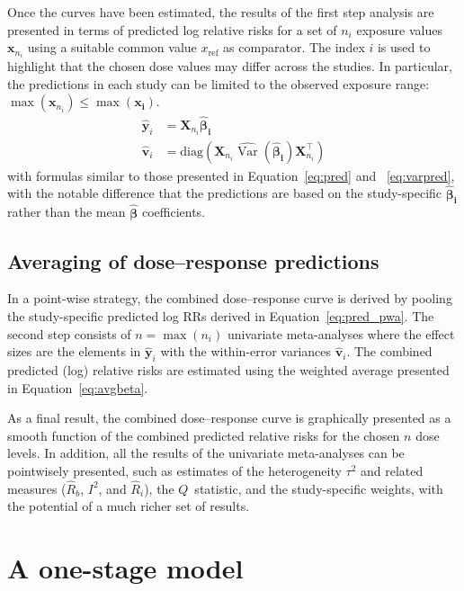 \documentclass[11pt,a4paper,twoside,openany]{book}\usepackage{knitr}
\DeclareMathOperator{\Var}{Var}
\begin{document}
{{Once the curves have been estimated, the results of the first step analysis are presented in terms of predicted log relative risks for a set of $n_i$ exposure values $\mathbf{x}_{n_i}$ using a suitable common value $x_\mathrm{ref}$ as comparator. The index $i$ is used to highlight that the chosen dose values may differ across the studies. In particular, the predictions in each study can be limited to the observed exposure range: $\max \left( \mathbf{x}_{n_i} \right) \le \max \left( \mathbf{x_i} \right)$.
\begin{align}
\hat {\boldsymbol y}_i &= \mathbf{X}_{n_i} \boldsymbol{\hat \beta_i}
\label{eq:pred_pwa} \\
\hat{\boldsymbol{v}}_i &= \mathrm{diag}\left( \mathbf{X}_{n_i} \widehat{\Var} \left( \boldsymbol{\hat \beta_i} \right) \mathbf{X}_{n_i}^\top \right)
\label{eq:predv_pwa}
\end{align}
\noindent with formulas similar to those presented in Equation~\ref{eq:pred} and ~\ref{eq:varpred}, with the notable difference that the predictions are based on the study-specific $\boldsymbol{\hat \beta_i}$ rather than the mean $\boldsymbol{\hat \beta}$ coefficients.

\subsection{Averaging of dose--response predictions}

In a point-wise strategy, the combined dose--response curve is derived by pooling the study-specific predicted log RRs derived in Equation~\ref{eq:pred_pwa}. The second step consists of $n = \max(n_i)$ univariate meta-analyses where the effect sizes are the elements in $\hat {\boldsymbol y}_i$ with the within-error variances $\hat{\boldsymbol{v}}_i$.
The combined predicted (log) relative risks are estimated using the weighted average presented in Equation~\ref{eq:avgbeta}.

As a final result, the combined dose--response curve is graphically presented as a smooth function of the combined predicted relative risks for the chosen $n$ dose levels. In addition, all the results of the univariate meta-analyses can be pointwisely presented, such as estimates of the heterogeneity $\tau^2$ and related measures ($\hat R_b$, $I^2$, and $\hat R_i$), the $Q$~statistic, and the study-specific weights, with the potential of a much richer set of results.


\section{A one-stage model}

}}
\end{document}
